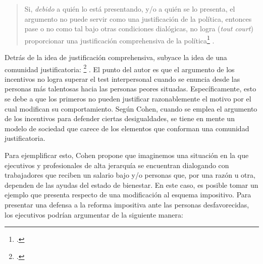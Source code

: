 \vspace{3mm}
\begin{quote}
    Si, \textit{debido} a quién lo está presentando, y/o a quién se lo presenta, el argumento no puede servir como una justificación de la política, entonces pase o no como tal bajo otras condiciones dialógicas, no logra (\textit{tout court}) proporcionar una justificación comprehensiva de la política\footnote{ \citep[p. 42]{Cohen_2008}.} \citep[p. 42]{Cohen_2008}.
\end{quote}
\vspace{3mm}

Detrás de la idea de justificación comprehensiva, subyace la idea de una comunidad justificatoria: \footnote{ \citep[p. 43]{Cohen_2008}.} \citep[p. 43]{Cohen_2008}. El punto del autor es que el argumento de los incentivos no logra superar el test interpersonal cuando se enuncia desde las personas más talentosas hacia las personas peores situadas. Específicamente, esto se debe a que los primeros no pueden justificar razonablemente el motivo por el cual modifican su comportamiento. Según Cohen, cuando se emplea el argumento de los incentivos para defender ciertas desigualdades, se tiene en mente un modelo de sociedad que carece de los elementos que conforman una comunidad justificatoria. 

Para ejemplificar esto, Cohen propone que imaginemos una situación en la que ejecutivos y profesionales de alta jerarquía se encuentran dialogando con trabajadores que reciben un salario bajo y/o personas que, por una razón u otra, dependen de las ayudas del estado de bienestar. En este caso, es posible tomar un ejemplo que presenta \citet{Cohen_2008} respecto de una modificación al esquema impositivo. Para presentar una defensa a la reforma impositiva ante las personas desfavorecidas, los ejecutivos podrían argumentar de la siguiente manera:

